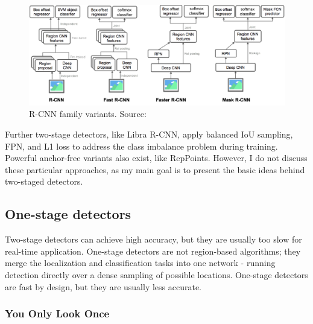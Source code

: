 \begin{figure}[htb]
 \centerline{\includegraphics[width=1.0\columnwidth]{.//Figure/Detector/RCNN_family.png}}
 \caption{R-CNN family variants. Source: \cite{ObjDetArchitectures3}}
 \label{fig:RCNN_family}
\end{figure}

Further two-stage detectors, like Libra R-CNN\cite{LibraR-CNN}, apply balanced IoU sampling, FPN, and L1 loss to address the class imbalance problem during training. Powerful anchor-free variants also exist, like RepPoints. However, I do not discuss these particular approaches, as my main goal is to present the basic ideas behind two-staged detectors.

\subsection{One-stage detectors}

Two-stage detectors can achieve high accuracy, but they are usually too slow for real-time application. One-stage detectors are not region-based algorithms; they merge the localization and classification tasks into one network - running detection directly over a dense sampling of possible locations. One-stage detectors are fast by design, but they are usually less accurate.

\subsubsection{You Only Look Once}

